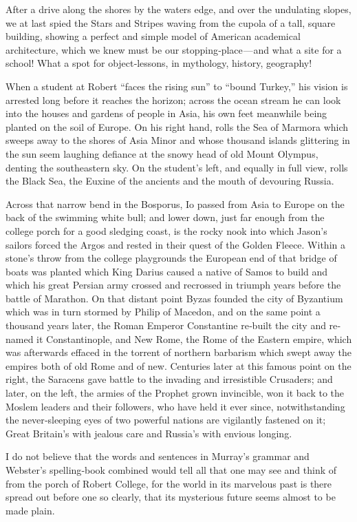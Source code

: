 \documentclass[12pt]{book}
\begin{document}
After a drive along the shores by the waters edge, and over the undulating
slopes, we at last spied the Stars and Stripes waving from the cupola of a tall,
square building, showing a perfect and simple model of American academical
architecture, which we knew must be our stopping‐place — and what a site for a
school! What a spot for object‐lessons, in mythology, history, geography!

When a student at Robert “faces the rising sun” to “bound Turkey,” his vision
is arrested long before it reaches the horizon; across the ocean stream he can look
into the houses and gardens of people in Asia, his own feet meanwhile being
planted on the soil of Europe. On his right hand, rolls the Sea of Marmora which
sweeps away to the shores of Asia Minor and whose thousand islands glittering
in the sun seem laughing defiance at the snowy head of old Mount Olympus,
denting the southeastern sky. On the student’s left, and equally in full view, rolls
the Black Sea, the Euxine of the ancients and the mouth of devouring Russia.

Across that narrow bend in the Bosporus, Io passed from Asia to Europe on
the back of the swimming white bull; and lower down, just far enough from the
college porch for a good sledging coast, is the rocky nook into which Jason’s
sailors forced the Argos and rested in their quest of the Golden Fleece. Within a
stone’s throw from the college playgrounds the European end of that bridge of
boats was planted which King Darius caused a native of Samos to build and which
his great Persian army crossed and recrossed in triumph years before the battle
of Marathon. On that distant point Byzas founded the city of Byzantium which
was in turn stormed by Philip of Macedon, and on the same point a thousand
years later, the Roman Emperor Constantine re‐built the city and re‐named it
Constantinople, and New Rome, the Rome of the Eastern empire, which was
afterwards effaced in the torrent of northern barbarism which swept away the
empires both of old Rome and of new. Centuries later at this famous point on
the right, the Saracens gave battle to the invading and irresistible Crusaders; and
later, on the left, the armies of the Prophet grown invincible, won it back to the
Moslem leaders and their followers, who have held it ever since, notwithstanding
the never‐sleeping eyes of two powerful nations are vigilantly fastened on it;
Great Britain’s with jealous care and Russia’s with envious longing.

I do not believe that the words and sentences in Murray’s grammar and
Webster’s spelling‐book combined would tell all that one may see and think of
from the porch of Robert College, for the world in its marvelous past is there
spread out before one so clearly, that its mysterious future seems almost to be
made plain.
\end{document}
